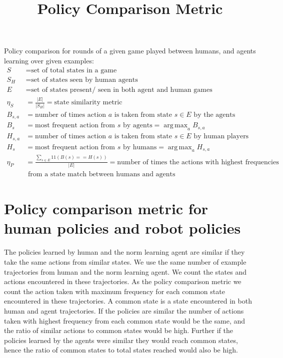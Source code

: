 \documentclass[12pt]{article}
\title{Policy Comparison Metric}
\date{}
\newcommand{\unit}{1\!\!1}
\DeclareMathOperator*{\argmax}{arg\,max}
\begin{document}
\maketitle
Policy comparison for rounds of a given game played between humans, and agents learning over given examples:
\begin{align*} 
S &=\textrm{set of total states in a game}\\
S_H &= \textrm{set of states seen by human agents}\\
E &= \textrm{set of states present/ seen in both agent and human games}\\
\eta_S &= \frac{|E|}{|S_H|} = \textrm{state similarity metric} \\
B_{s,a} &= \textrm{number of times action $a$ is taken from state $s \in E$ by the agents}\\
B_{s} &= \textrm{most frequent action from $s$ by agents} = \argmax_{a} B_{s,a}\\
H_{s,a} &= \textrm{number of times action $a$ is taken from state $s \in E$ by human players}\\
H_{s} &= \textrm{most frequent action from $s$ by humans} = \argmax_{a} H_{s,a}\\
\eta_P &= \frac{\sum_{s \in E} {\unit(B(s) == H(s))}}{|E|} = \textrm{number of times the actions with highest frequencies }\\
&\textrm{ from a state match between humans and agents}
\end{align*}

\section{Policy comparison metric for human policies and robot policies}
The policies learned by human and the norm learning agent are similar if they take the same actions from similar states. We use the same number of example trajectories from human and the norm learning agent. We count the states and actions encountered in these trajectories. As the policy comparison metric we count the action taken with maximum frequency for each common state encountered in these trajectories. A common state is a state encountered in both human and agent trajectories. If the policies are similar the number of actions taken with highest frequency from each common state would be the same, and the ratio of similar actions to common states would be high. Further if the policies learned by the agents were similar they would reach common states, hence the ratio of common states to total states reached would also be high.
\end{document}
